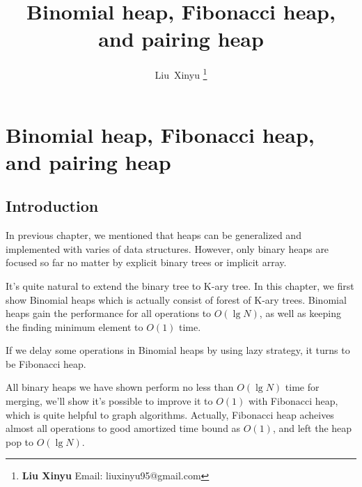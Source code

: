 \documentclass{article}
\begin{document}
\fi


\title{Binomial heap, Fibonacci heap, and pairing heap}

\author{Liu~Xinyu
\thanks{{\bfseries Liu Xinyu } \newline
  Email: liuxinyu95@gmail.com \newline}
  }


\maketitle

\ifx\wholebook\relax
\chapter{Binomial heap, Fibonacci heap, and pairing heap}
\fi

\section{Introduction}
\label{introduction}
In previous chapter, we mentioned that heaps can be
generalized and implemented with varies of data structures. However,
only binary heaps are focused so far no matter by explicit binary
trees or implicit array. 

It's quite natural to extend the binary tree to K-ary \cite{K-ary-tree} tree. 
In this chapter, we first show Binomial heaps 
which is actually consist of forest of K-ary trees. Binomial heaps gain the 
performance for all operations to $O(\lg N)$, as well as keeping the finding 
minimum element to $O(1)$ time.

If we delay some operations in Binomial
heaps by using lazy strategy, it turns to be Fibonacci heap.
 
All binary heaps we have shown perform
no less than $O(\lg N)$ time for merging, we'll show it's possible to 
improve it to $O(1)$ with Fibonacci heap, which is quite helpful to 
graph algorithms. Actually, Fibonacci heap acheives almost all operations 
to good amortized time bound as $O(1)$,
and left the heap pop to $O(\lg N)$. 
\end{document}
